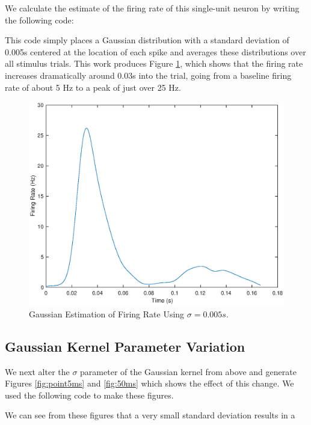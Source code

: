 \documentclass[11pt, oneside]{article}
\begin{document}
We calculate the estimate of the firing rate of this single-unit neuron by writing the following code:

This code simply places a Gaussian distribution with a standard deviation of 0.005s centered at the location of each spike and averages these distributions over all stimulus trials. This work produces Figure \ref{fig:Gaussian}, which shows that the firing rate increases dramatically around 0.03s into the trial, going from a baseline firing rate of about 5 Hz to a peak of just over 25 Hz. 

\begin{figure}[ht!]
\includegraphics[width=1\textwidth]{fivemillisecondplot.eps}
\caption{Gaussian Estimation of Firing Rate Using $\sigma = 0.005s$.}
\label{fig:Gaussian}
\end{figure}

\subsection{Gaussian Kernel Parameter Variation}

We next alter the $\sigma$ parameter of the Gaussian kernel from above and generate Figures \ref{fig:point5ms} and \ref{fig:50ms} which shows the effect of this change. We used the following code to make these figures.

We can see from these figures that a very small standard deviation results in a 
\end{document}
